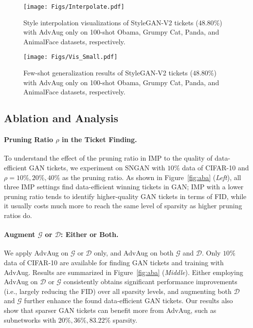\documentclass{article}
\begin{document}
\begin{multicols}{2}
\begin{figure}[H]
\centering
\texttt{[image: Figs/Interpolate.pdf]}
\vspace{-3mm}
\caption{\small Style interpolation visualizations of StyleGAN-V2 tickets ($48.80\%$) with AdvAug only on 100-shot Obama, Grumpy Cat, Panda, and AnimalFace datasets, respectively.}
\vspace{-1em}
\label{fig:vis_nopre}
\end{figure}

\begin{figure}[H] 
\centering
\texttt{[image: Figs/Vis\_Small.pdf]}
\vspace{-3mm}
\caption{\small Few-shot generalization results of StyleGAN-V2 tickets ($48.80\%$) with AdvAug only on 100-shot Obama, Grumpy Cat, Panda, and AnimalFace datasets, respectively.}
\vspace{-1em}
\label{fig:100shot_generation}
\end{figure}
\end{multicols}



\subsection{Ablation and Analysis} \label{sec:ablation}
\vspace{-0.5em}
\paragraph{Pruning Ratio $\rho$ in the Ticket Finding.} To understand the effect of the pruning ratio in IMP to the quality of data-efficient GAN tickets, we experiment on SNGAN with $10\%$ data of CIFAR-10 and $\rho=10\%,20\%,40\%$ as the pruning ratio. As shown in Figure~\ref{fig:aba} (\textit{Left}), all three IMP settings find data-efficient winning tickets in GAN; IMP with a lower pruning ratio tends to identify higher-quality GAN tickets in terms of FID, while it usually costs much more to reach the same level of sparsity as higher pruning ratios do.

\vspace{-0.5em}
\paragraph{Augment $\mathcal{G}$ or $\mathcal{D}$: Either or Both.} We apply AdvAug on $\mathcal{G}$ or $\mathcal{D}$ only, and AdvAug on both $\mathcal{G}$ and $\mathcal{D}$. Only $10\%$ data of CIFAR-10 are available for finding GAN tickets and training with AdvAug. Results are summarized in Figure~\ref{fig:aba} (\textit{Middle}). Either employing AdvAug on $\mathcal{D}$ or $\mathcal{G}$ consistently obtains significant performance improvements (i.e., largely reducing the FID) over all sparsity levels, and augmenting both $\mathcal{D}$ and $\mathcal{G}$ further enhance the found data-efficient GAN tickets. Our results also show that sparser GAN tickets can benefit more from AdvAug, such as subnetworks with $20\%,36\%,83.22\%$ sparsity.
\end{document}
